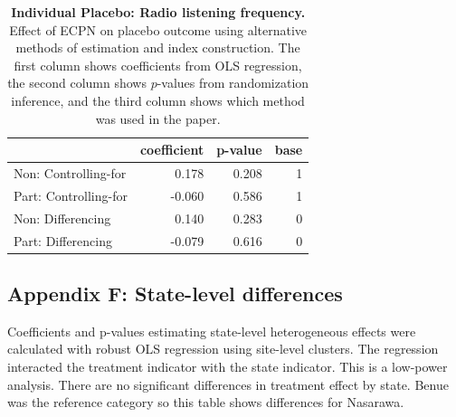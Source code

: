 \documentclass[
]{article}
\begin{document}
\begin{table}[H]
\begin{center}
\label{tab:pl_rad_ind}
\caption{\textbf{Individual Placebo: Radio listening frequency.} Effect of ECPN on placebo outcome using alternative methods of estimation and index construction. The first column shows coefficients from OLS regression, the second column shows $p$-values from randomization inference, and the third column shows which method was used in the paper.}
\smallskip

\begin{tabular}{l|r|r|r}
\hline
  & coefficient & p-value & base\\
\hline
Non: Controlling-for & 0.178 & 0.208 & 1\\
\hline
Part: Controlling-for & -0.060 & 0.586 & 1\\
\hline
Non: Differencing & 0.140 & 0.283 & 0\\
\hline
Part: Differencing & -0.079 & 0.616 & 0\\
\hline
\end{tabular}


\end{center}
\end{table}

\hypertarget{appendix-f-state-level-differences}{%
\subsection{Appendix F: State-level
differences}\label{appendix-f-state-level-differences}}

Coefficients and p-values estimating state-level heterogeneous effects
were calculated with robust OLS regression using site-level clusters.
The regression interacted the treatment indicator with the state
indicator. This is a low-power analysis. There are no significant
differences in treatment effect by state. Benue was the reference
category so this table shows differences for Nasarawa.
\end{document}
